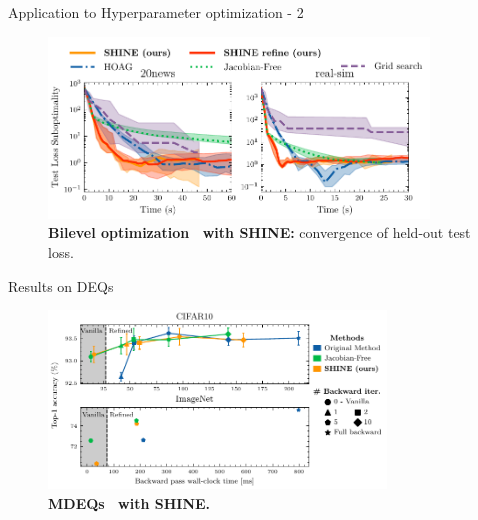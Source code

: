 \begin{frame}{Application to Hyperparameter optimization - 2}
    \begin{figure}
        \centering
        \includegraphics[width=0.9\textwidth]{Figures/shine_figures/bilevel_test.pdf}
        \caption{\textbf{Bilevel optimization~\citep{Pedregosa2016HyperparameterGradient} with SHINE:} convergence of held-out test loss.}
    \end{figure}
    
\end{frame}

\begin{frame}{Results on DEQs}
    \begin{figure}
        \centering
        \includegraphics[width=0.8\textwidth]{Figures/shine_figures/merged_results_latency_style.pdf}
        \caption{\textbf{MDEQs~\citep{Bai2020MultiscaleModels} with SHINE.}}
    \end{figure}
\end{frame}

        
        
        
